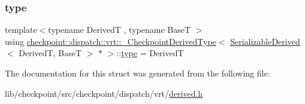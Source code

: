 \subsubsection{\texorpdfstring{type}{type}}
{\footnotesize\ttfamily template$<$typename DerivedT , typename BaseT $>$ \\
using \hyperlink{structcheckpoint_1_1dispatch_1_1vrt_1_1___checkpoint_derived_type}{checkpoint\+::dispatch\+::vrt\+::\+\_\+\+Checkpoint\+Derived\+Type}$<$ \hyperlink{structcheckpoint_1_1dispatch_1_1vrt_1_1_serializable_derived}{Serializable\+Derived}$<$ DerivedT, BaseT $>$ $\ast$ $>$\+::\hyperlink{structcheckpoint_1_1dispatch_1_1vrt_1_1___checkpoint_derived_type_3_01_serializable_derived_3_0142c576e50eb568281bb6c0a86d22e7e8_a47e458d66c67f83cbe4ff672e6e62dd7}{type} =  DerivedT}



The documentation for this struct was generated from the following file\+:\begin{DoxyCompactItemize}
\item 
lib/checkpoint/src/checkpoint/dispatch/vrt/\hyperlink{derived_8h}{derived.\+h}\end{DoxyCompactItemize}
